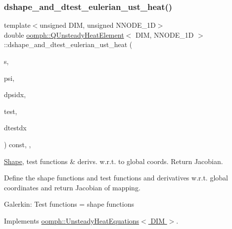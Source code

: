 \mbox{\label{classoomph_1_1QUnsteadyHeatElement_a6ebc0c1826e01fbd03132b1617673ff7}} 
\subsubsection{\texorpdfstring{dshape\+\_\+and\+\_\+dtest\+\_\+eulerian\+\_\+ust\+\_\+heat()}{dshape\_and\_dtest\_eulerian\_ust\_heat()}}
{\footnotesize\ttfamily template$<$unsigned D\+IM, unsigned N\+N\+O\+D\+E\+\_\+1D$>$ \\
double \hyperlink{classoomph_1_1QUnsteadyHeatElement}{oomph\+::\+Q\+Unsteady\+Heat\+Element}$<$ D\+IM, N\+N\+O\+D\+E\+\_\+1D $>$\+::dshape\+\_\+and\+\_\+dtest\+\_\+eulerian\+\_\+ust\+\_\+heat (\begin{DoxyParamCaption}\item[{const \hyperlink{classoomph_1_1Vector}{Vector}$<$ double $>$ \&}]{s,  }\item[{\hyperlink{classoomph_1_1Shape}{Shape} \&}]{psi,  }\item[{\hyperlink{classoomph_1_1DShape}{D\+Shape} \&}]{dpsidx,  }\item[{\hyperlink{classoomph_1_1Shape}{Shape} \&}]{test,  }\item[{\hyperlink{classoomph_1_1DShape}{D\+Shape} \&}]{dtestdx }\end{DoxyParamCaption}) const\hspace{0.3cm}{\ttfamily [inline]}, {\ttfamily [protected]}, {\ttfamily [virtual]}}



\hyperlink{classoomph_1_1Shape}{Shape}, test functions \& derivs. w.\+r.\+t. to global coords. Return Jacobian. 

Define the shape functions and test functions and derivatives w.\+r.\+t. global coordinates and return Jacobian of mapping.

Galerkin\+: Test functions = shape functions 

Implements \hyperlink{classoomph_1_1UnsteadyHeatEquations_a70c72c1d6e716657d819264f1131b77c}{oomph\+::\+Unsteady\+Heat\+Equations$<$ D\+I\+M $>$}.



